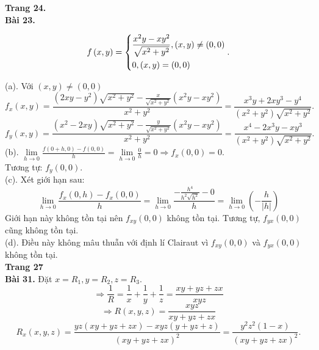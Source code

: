 \documentclass[12pt,a4paper]{article}
\begin{document}
\textbf{Trang 24.}\\
\textbf{Bài 23.}
\begin{mybox}
\[f\left( {x,y} \right) = \left\{ \begin{gathered}
  \frac{{{x^2}y - x{y^2}}}{{\sqrt {{x^2} + {y^2}} }},\left( {x,y} \right) \ne \left( {0,0} \right) \hfill \\
  0,\left( {x,y} \right) = \left( {0,0} \right) \hfill \\ 
\end{gathered}  \right..\]
\end{mybox}
(a). Với \(\left( {x,y} \right) \ne \left( {0,0} \right)\)
\[{f_x}\left( {x,y} \right) = \frac{{\left( {2xy - {y^2}} \right)\sqrt {{x^2} + {y^2}}  - \frac{x}{{\sqrt {{x^2} + {y^2}} }}\left( {{x^2}y - x{y^2}} \right)}}{{{x^2} + {y^2}}} = \frac{{{x^3}y + 2x{y^3} - {y^4}}}{{\left( {{x^2} + {y^2}} \right)\sqrt {{x^2} + {y^2}} }}.\]
\[{f_y}\left( {x,y} \right) = \frac{{\left( {{x^2} - 2xy} \right)\sqrt {{x^2} + {y^2}}  - \frac{y}{{\sqrt {{x^2} + {y^2}} }}\left( {{x^2}y - x{y^2}} \right)}}{{{x^2} + {y^2}}} = \frac{{{x^4} - 2{x^3}y - x{y^3}}}{{\left( {{x^2} + {y^2}} \right)\sqrt {{x^2} + {y^2}} }}.\]
(b). \(\mathop {\lim }\limits_{h \to 0} \frac{{f\left( {0 + h,0} \right) - f\left( {0,0} \right)}}{h} = \mathop {\lim }\limits_{h \to 0} \frac{0}{h} = 0 \Rightarrow {f_x}\left( {0,0} \right) = 0.\)\\
Tương tự: \({f_y}\left( {0,0} \right).\)\\
(c). Xét giới hạn sau:
\[\mathop {\lim }\limits_{h \to 0} \frac{{{f_x}\left( {0,h} \right) - {f_x}\left( {0,0} \right)}}{h} = \mathop {\lim }\limits_{h \to 0} \frac{{ - \frac{{{h^4}}}{{{h^2}\sqrt {{h^2}} }} - 0}}{h} = \mathop {\lim }\limits_{h \to 0} \left( { - \frac{h}{{\left| h \right|}}} \right)\]
Giới hạn này không tồn tại nên \({f_{xy}}\left( {0,0} \right)\) không tồn tại. Tương tự, \({f_{yx}}\left( {0,0} \right)\) cũng không tồn tại.\\
(d). Điều này không mâu thuẫn với định lí Clairaut vì \({f_{xy}}\left( {0,0} \right)\) và \({f_{yx}}\left( {0,0} \right)\) không tồn tại.\\
\textbf{Trang 27}\\
\textbf{Bài 31.}
Đặt \(x = {R_1},y = {R_2},z = {R_3}.\)
\[ \Rightarrow \frac{1}{R} = \frac{1}{x} + \frac{1}{y} + \frac{1}{z} = \frac{{xy + yz + zx}}{{xyz}}\]
\[ \Rightarrow R\left( {x,y,z} \right) = \frac{{xyz}}{{xy + yz + zx}}\]
\[{R_x}\left( {x,y,z} \right) = \frac{{yz\left( {xy + yz + zx} \right) - xyz\left( {y + yz + z} \right)}}{{{{\left( {xy + yz + zx} \right)}^2}}} = \frac{{{y^2}{z^2}\left( {1 - x} \right)}}{{{{\left( {xy + yz + zx} \right)}^2}}}.\]
\end{document}
